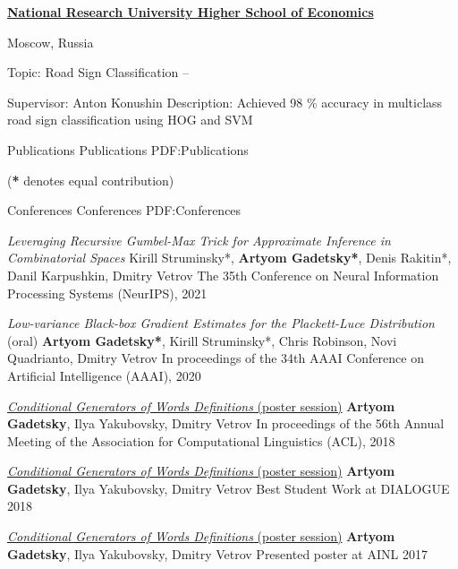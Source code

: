 \documentclass[letterpaper,MMMyyyy,nonstopmode]{simpleresumecv}
\begin{document}
\begin{Body}
\Gap

\Entry
\href{https://www.hse.ru/en/}
{\textbf{National Research University Higher School of Economics}}
\par
Moscow, Russia

\Gap
\BulletItem
Topic: Road Sign Classification
\hfill
{} --
\begin{Detail}
\SubBulletItem
Supervisor:
Anton Konushin
\SubBulletItem
Description:
Achieved 98 \% accuracy in multiclass road sign classification \newline
using HOG and SVM
\end{Detail}


\Section
{Publications}
{Publications}
{PDF:Publications}

\Entry
\hfill
(\textbf{*} denotes equal contribution)

\SubSection
{Conferences}
{Conferences}
{PDF:Conferences}

\Item
\textit{Leveraging Recursive Gumbel-Max Trick for Approximate Inference in Combinatorial Spaces}
\Item
Kirill Struminsky*, \textbf{Artyom Gadetsky*}, Denis Rakitin*, Danil Karpushkin, Dmitry Vetrov
\Item
The 35th Conference on Neural Information Processing Systems (NeurIPS), 2021

\Gap
\Item
\textit{Low-variance Black-box Gradient Estimates for the Plackett-Luce Distribution} (oral)
\Item
\textbf{Artyom Gadetsky*}, Kirill Struminsky*, Chris Robinson, Novi Quadrianto, Dmitry Vetrov
\Item
In proceedings of the 34th AAAI Conference on Artificial Intelligence (AAAI), 2020

\Gap
\Item
\href{https://aclanthology.info/papers/P18-2043/p18-2043}{\textit{Conditional Generators of Words Definitions} (poster session)}
\Item
\textbf{Artyom Gadetsky}, Ilya Yakubovsky, Dmitry Vetrov
\Item
In proceedings of the 56th Annual Meeting of the \newline
Association for Computational Linguistics (ACL), 2018

\Gap
\Item
\href{http://www.dialog-21.ru/en/}{\textit{Conditional Generators of Words Definitions} (poster session)}
\Item
\textbf{Artyom Gadetsky}, Ilya Yakubovsky, Dmitry Vetrov
\Item
Best Student Work at DIALOGUE 2018

\Gap
\Item
\href{http://ainlconf.ru/2017}{\textit{Conditional Generators of Words Definitions} (poster session)}
\Item
\textbf{Artyom Gadetsky}, Ilya Yakubovsky, Dmitry Vetrov
\Item
Presented poster at AINL 2017


\end{Body}
\end{document}
